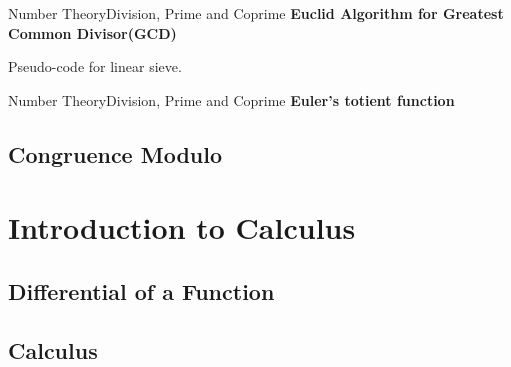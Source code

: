 \documentclass[10pt]{beamer}
\begin{document}
\begin{frame}{Number Theory}{Division, Prime and Coprime}
\textbf{\large Euclid Algorithm for Greatest Common Divisor(GCD)}
\begin{algorithm}[H]
\begin{algorithmic}[1]
	\ELSE
	\ENDIF
\end{algorithmic}
\caption*{Pseudo-code for linear sieve.}
\end{algorithm}
\end{frame}

\begin{frame}{Number Theory}{Division, Prime and Coprime}
\textbf{\large Euler's totient function}

\end{frame}


\subsection{Congruence Modulo}



\section{Introduction to Calculus}
\subsection{Differential of a Function}


\subsection{Calculus}




{\1
\begin{frame}
\end{frame}}
\end{document}
